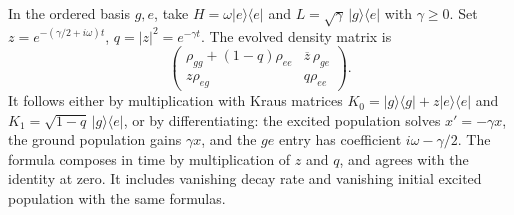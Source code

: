 \begin{example}
In the ordered basis \(g,e\), take \(H=\omega |e\rangle\langle e|\)
and \(L=\sqrt\gamma\,|g\rangle\langle e|\) with \(\gamma\ge0\).
Set \(z=e^{-(\gamma/2+i\omega)t}\), \(q=|z|^2=e^{-\gamma t}\).
The evolved density matrix is
\[
 \begin{pmatrix}
 \rho_{gg}+(1-q)\rho_{ee} & \overline z\,\rho_{ge}\\
 z\rho_{eg} & q\rho_{ee}
 \end{pmatrix}.
\]
It follows either by multiplication with Kraus matrices
\(K_0=|g\rangle\langle g|+z|e\rangle\langle e|\) and
\(K_1=\sqrt{1-q}\,|g\rangle\langle e|\), or by differentiating:
the excited population solves \(x'=-\gamma x\), the ground population
gains \(\gamma x\), and the \(ge\) entry has coefficient
\(i\omega-\gamma/2\). The formula composes in time by multiplication
of \(z\) and \(q\), and agrees with the identity at zero. It includes
vanishing decay rate and vanishing initial excited population with the
same formulas.
\end{example}
